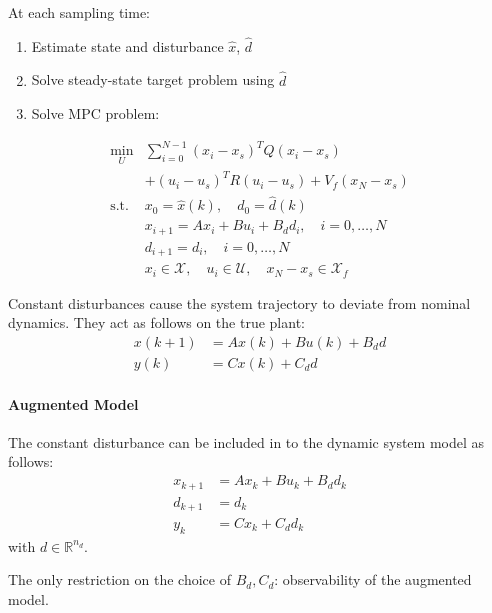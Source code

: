 At each sampling time:
\begin{enumerate}
    \item Estimate state and disturbance $\hat{x}$, $\hat{d}$
    \item Solve steady-state target problem using $\hat{d}$
    \item Solve MPC problem:
\end{enumerate}
\begin{align*}
    \min_U       & \sum_{i=0}^{N-1} {(x_i - x_s)}^T Q (x_i - x_s)                                    \\
                 & + {(u_i - u_s)}^T R (u_i - u_s) + V_f(x_N - x_s)                                  \\
    \text{s.t. } & x_0 = \hat{x}(k), \quad d_0 = \hat{d}(k)                                          \\
                 & x_{i+1} = Ax_i + Bu_i + B_d d_i, \quad i = 0, \dots, N                            \\
                 & d_{i+1} = d_i, \quad i = 0, \dots, N                                              \\
                 & x_i \in \mathcal{X}, \quad u_i \in \mathcal{U}, \quad x_N - x_s \in \mathcal{X}_f
\end{align*}
\newpar{}
\label{const_dist}

Constant disturbances cause the system trajectory to deviate from nominal dynamics. They act as follows on the true plant:
\begin{align*}
    x(k+1) & = Ax(k) + Bu(k) + B_d d \\
    y(k)   & = Cx(k) + C_d d
\end{align*}

\paragraph{Augmented Model}

The constant disturbance can be included in to the dynamic system model as follows:
\begin{align*}
    x_{k+1} & = Ax_k + Bu_k + B_d d_k \\
    d_{k+1} & = d_k                   \\
    y_k     & = Cx_k + C_d d_k
\end{align*}
with $d \in \mathbb{R}^{n_d}$.

The only restriction on the choice of $B_d, C_d$: observability of the augmented model.
\newpar{}

